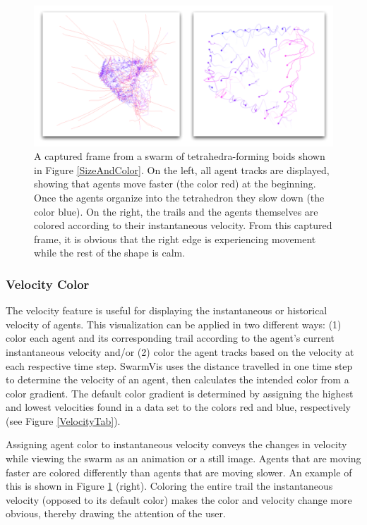 \documentclass[conference]{IEEEtran}
\begin{document}
\begin{figure}
\centering
\includegraphics[scale=.33333]{images/velocity.pdf}
\caption{
A captured frame from a swarm of tetrahedra-forming boids shown in Figure \ref{SizeAndColor}.
On the left, all agent tracks are displayed, showing that agents move faster (the color red) at the beginning.
Once the agents organize into the tetrahedron they slow down (the color blue).
On the right, the trails and the agents themselves are colored according to their instantaneous velocity.
From this captured frame, it is obvious that the right edge is experiencing movement while the rest of the
shape is calm. }
\label{Velocity}
\end{figure}

\subsubsection{Velocity Color}

The velocity feature is useful for displaying the instantaneous or historical velocity of agents.
This visualization can be applied in two different ways:
(1) color each agent and its corresponding trail according to the agent's current instantaneous velocity and/or
(2) color the agent tracks based on the velocity at each respective time step.
SwarmVis uses the distance travelled in one time step to determine the velocity of an agent, then calculates the 
intended color from a color gradient.
The default color gradient is determined by assigning the highest and lowest velocities found in a data set to the colors red and blue, respectively (see Figure \ref{VelocityTab}).

Assigning agent color to instantaneous velocity conveys the changes in velocity while viewing the swarm as an animation or a still image.
Agents that are moving faster are colored differently than agents that are moving slower.
An example of this is shown in Figure \ref{Velocity} (right).
Coloring the entire trail the instantaneous velocity (opposed to its default color) makes the color and velocity change more obvious,
thereby drawing the attention of the user.
\end{document}
